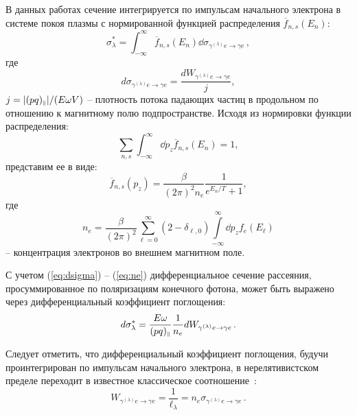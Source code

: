 В данных работах сечение интегрируется по импульсам начального 
электрона в системе покоя плазмы
с нормированной функцией распределения $\overline{f}_{n,s}(E_n)$:
\begin{equation}\label{eq:dsigma}
	\sigma^*_\lambda=\int_{-\infty}^{\infty} 
	\overline{f}_{n,s}(E_n)\dd\sigma_{\gamma^{(\lambda)} e\to \gamma e}\, ,
\end{equation}
где 
\begin{equation}
	d\sigma_{\gamma^{(\lambda)} e\to \gamma e}= \frac{dW_{\gamma^{(\lambda)} e \to \gamma e}}{j},
\end{equation}
$j=|(pq)_{\mbox{\tiny $\|$}}|/(E \omega V)$ -- плотность потока падающих 
частиц  в продольном по отношению к магнитному полю подпространстве. Исходя из 
нормировки функции распределения:
\begin{equation}
	\sum_{n,s}\int_{-\infty}^{\infty} \dd p_z \overline{f}_{n,s}(E_n)=1,
\end{equation}
представим ее в виде:
\begin{equation}
	\overline{f}_{n,s}(p_z)=\frac{\beta}{(2\pi)^2n_e}\frac{1}{e^{E_n/T}+1},
\end{equation}
где 
\begin{equation}\label{eq:ne}
	n_e = \frac{\beta}{(2 \pi)^2} \sum \limits^{\infty}_{\ell=0} 
	(2-\delta_{\ell,0}) \int \limits^{\infty}_{-\infty}\dd p_z f_{e}(E_{\ell})
\end{equation}
-- концентрация электронов во внешнем магнитном поле.

С учетом (\ref{eq:dsigma}) -- (\ref{eq:ne}) дифференциальное сечение рассеяния, просуммированное по 
поляризациям конечного фотона, может быть выражено через дифференциальный 
коэффициент поглощения:
\begin{equation}
	d\sigma^*_\lambda=\frac{E\omega}{(pq)_{\mbox{\tiny $\|$}}}\frac{1}{n_e} 
	dW_{\gamma^{(\lambda)} e\to\gamma e}\, .
\end{equation}

Следует отметить, что дифференциальный коэффициент поглощения, будучи 
проинтегрирован по импульсам 
начального 
электрона, в 
нерелятивистском пределе переходит в известное классическое соотношение~\cite{Landau:1989}:
\begin{equation}
W_{\gamma^{(\lambda)} e\to\gamma e}=\frac{1}{\ell_\lambda}=n_e 
\sigma_{\gamma^{(\lambda)} e\to\gamma e}\, .
\end{equation}

